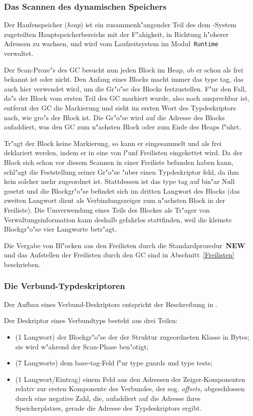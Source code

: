 \subsubsection{Das Scannen des dynamischen Speichers}
\label{Scannen}

Der Haufenspeicher ({\it heap}) ist ein zusammenh"angender Teil des
dem \oberon-System zugeteilten Hauptspeicherbereichs mit der F"ahigkeit,
in Richtung h"oherer Adressen zu wachsen, und wird vom Laufzeitsystem im
Modul~{\tt Runtime} verwaltet.

Der Scan-Proze"s des GC besucht nun jeden Block im Heap, ob er schon als frei
bekannt ist oder nicht.
Den Anfang eines Blocks macht immer das type tag, das auch hier
verwendet wird, um die Gr"o"se des Blocks festzustellen.
F"ur den Fall, da"s der Block vom ersten Teil des GC markiert wurde,
also noch ansprechbar ist, entfernt der GC die Markierung und sieht
im ersten Wort des Typdeskriptors nach, wie gro"s der Block ist.
Die Gr"o"se wird auf die Adresse des Blocks aufaddiert, was den GC zum
n"achsten Block oder zum Ende des Heaps f"uhrt.

Tr"agt der Block keine Markierung, so kann er eingesammelt und als frei
deklariert werden, indem er in eine von f"unf Freilisten eingekettet wird.
Da der Block sich schon vor diesem Scannen in einer Freiliste befunden
haben kann, schl"agt die Feststellung seiner Gr"o"se "uber einen
Typdeskriptor fehl, da ihm kein solcher mehr zugeordnet ist.
Stattdessen ist das type tag auf bin"ar Null gesetzt und die Blockgr"o"se
befindet sich im dritten Langwort des Blocks (das zweiten Langwort dient
als Verbindungszeiger zum n"achsten Block in der Freiliste).
Die Umverwendung eines Teils des Blockes als Tr"ager von Verwaltungsinformation
kann deshalb gefahrlos stattfinden, weil die kleinste Blockgr"o"se vier
Langworte betr"agt.

Die Vergabe von Bl"ocken aus den Freilisten durch die Standardprozedur~{\bf NEW}
und das Aufstellen der Freilisten durch den GC sind in Abschnitt~\ref{Freilisten}
beschrieben.

\subsubsection{Die Verbund-Typdeskriptoren}

Der Aufbau eines Verbund-Deskriptors entspricht der Beschreibung in \cite[S.~33]{op2doc}.

Der Deskriptor eines Verbundtyps besteht aus drei Teilen:
\begin{itemize}
\item (1 Langwort) der Blockgr"o"se der der Struktur zugeordneten Klasse in Bytes;
  sie wird w"ahrend der Scan-Phase ben"otigt;
\item (7 Langworte) dem base-tag-Feld f"ur type guards und type tests;
\item (1 Langwort/Eintrag) einem Feld aus den Adressen der
  Zeiger-Komponenten relativ zur ersten Komponente des Verbundes, der
  sog. {\it offsets}, abgeschlossen durch eine negative Zahl, die,
  aufaddiert auf die Adresse ihres Speicherplatzes, gerade die Adresse
  des Typdeskriptors ergibt.
\end{itemize}

